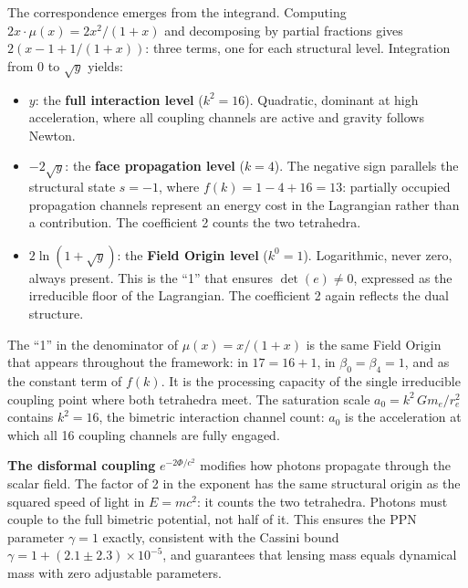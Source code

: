 \documentclass[aps,prd,preprint,superscriptaddress,showpacs,preprintnumbers,amsmath,amssymb,nofootinbib]{revtex4-2}
\begin{document}
The correspondence emerges from the integrand. Computing $2x \cdot \mu(x) = 2x^2/(1+x)$ and decomposing by partial fractions gives $2(x - 1 + 1/(1+x))$: three terms, one for each structural level. Integration from $0$ to $\sqrt{y}$ yields:
\begin{itemize}
\item $y$: the \textbf{full interaction level} ($k^2 = 16$). Quadratic, dominant at high acceleration, where all coupling channels are active and gravity follows Newton.
\item $-2\sqrt{y}$: the \textbf{face propagation level} ($k = 4$). The negative sign parallels the structural state $s = -1$, where $f(k) = 1 - 4 + 16 = 13$: partially occupied propagation channels represent an energy cost in the Lagrangian rather than a contribution. The coefficient 2 counts the two tetrahedra.
\item $2\ln(1 + \sqrt{y})$: the \textbf{Field Origin level} ($k^0 = 1$). Logarithmic, never zero, always present. This is the ``1'' that ensures $\det(e) \neq 0$, expressed as the irreducible floor of the Lagrangian. The coefficient 2 again reflects the dual structure.
\end{itemize}

The ``1'' in the denominator of $\mu(x) = x/(1+x)$ is the same Field Origin that appears throughout the framework: in $17 = 16 + 1$, in $\beta_0 = \beta_4 = 1$, and as the constant term of $f(k)$. It is the processing capacity of the single irreducible coupling point where both tetrahedra meet. The saturation scale $a_0 = k^2\,Gm_e/r_e^2$ contains $k^2 = 16$, the bimetric interaction channel count: $a_0$ is the acceleration at which all 16 coupling channels are fully engaged.

\textbf{The disformal coupling} $e^{-2\Phi/c^2}$ modifies how photons propagate through the scalar field. The factor of 2 in the exponent has the same structural origin as the squared speed of light in $E = mc^2$: it counts the two tetrahedra. Photons must couple to the full bimetric potential, not half of it. This ensures the PPN parameter $\gamma = 1$ exactly, consistent with the Cassini bound $\gamma = 1 + (2.1 \pm 2.3) \times 10^{-5}$, and guarantees that lensing mass equals dynamical mass with zero adjustable parameters.
\end{document}

